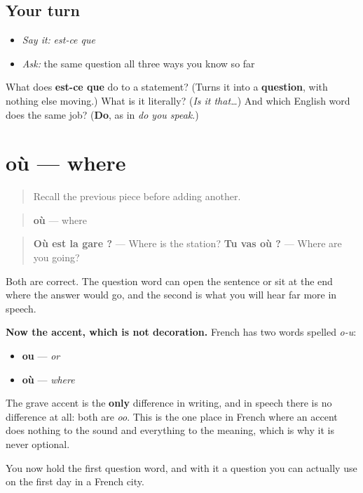 \subsection*{Your turn}
\begin{itemize}
\raggedright
  \item \emph{Say it:} \emph{est-ce que}
  \item \emph{Ask:} the same question all three ways you know so far
\end{itemize}

\begin{tcolorbox}[breakable,colback=teal!4,colframe=teal!35!black,title={Before you move on}]
What does \textbf{est-ce que} do to a statement? (Turns it into a \textbf{question}, with nothing else moving.) What is it literally? (\emph{Is it that…}) And which English word does the same job? (\textbf{Do}, as in \emph{do you speak}.)
\end{tcolorbox}
\section[où]{où — where}

\label{lesson:FR-C32-ou}



\begin{quote}
Recall the previous piece before adding another.
\end{quote}

\begin{cousinweb}
\begin{quote}
\textbf{où} — where
\end{quote}

\begin{quote}
\textbf{Où est la gare ?} — Where is the station? \textbf{Tu vas où ?} — Where are you going?
\end{quote}

Both are correct. The question word can open the sentence or sit at the end where the answer would go, and the second is what you will hear far more in speech.

\textbf{Now the accent, which is not decoration.} French has two words spelled \emph{o-u}:

\begin{itemize}
\raggedright
  \item \textbf{ou} — \emph{or}
  \item \textbf{où} — \emph{where}
\end{itemize}

The grave accent is the \textbf{only} difference in writing, and in speech there is no difference at all: both are \emph{oo}. This is the one place in French where an accent does nothing to the sound and everything to the meaning, which is why it is never optional.

You now hold the first question word, and with it a question you can actually use on the first day in a French city.
\end{cousinweb}

